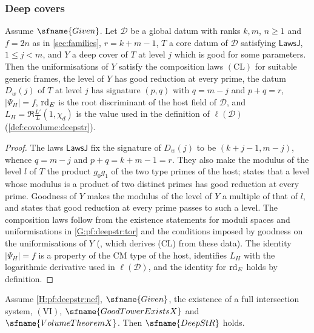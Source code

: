 \subsubsection*{Deep covers}

\begin{lemma}\label{lem:pf:deepstr:params}
Assume $\sfname{Given}$. Let $\mathcal D$ be a global datum with ranks $k,m$, $n\ge1$ and $f=2n$ as in
\cref{sec:families}, $r=k+m-1$, $T$ a core datum of $\mathcal D$ satisfying $\mathsf{LawsJ}$, $1\le j<m$, and $Y$
a deep cover of $T$ at level $j$ which is good for some parameters. Then the uniformisations of $Y$ satisfy
the composition laws $\mathrm{(CL)}$ for suitable generic frames, the level of $Y$ has good reduction at
every prime, the datum $D_w(j)$ of $T$ at level $j$ has signature $(p,q)$ with $q=m-j$ and $p+q=r$,
$|\Psi_H|=f$, $\operatorname{rd}_E$ is the root discriminant of the host field of $\mathcal D$, and
$L_H=\Re\frac{L'}{L}(1,\chi_d)$ is the value used in the definition of $\ell(\mathcal D)$
(\cref{def:covolume:deepstr}).
\end{lemma}

\begin{proof}
The laws $\mathsf{LawsJ}$ fix the signature of $D_w(j)$ to be $(k+j-1,m-j)$, whence $q=m-j$ and
$p+q=k+m-1=r$. They also make the modulus of the level $l$ of $T$ the product $g_0g_1$ of the two type primes
of the host;  states that a level whose modulus is a product
of two distinct primes has good reduction at every prime. Goodness of $Y$ makes the modulus of the level of $Y$ a multiple of that of $l$, and
 states that good reduction at every prime passes to such a
level. The composition laws follow from the existence statements for moduli spaces and uniformisations in
\ref{G:pf:deepstr:tor} and the conditions imposed by goodness on the uniformisations of $Y$
(, which derives (CL) from these data).
The identity $|\Psi_H|=f$ is a property of the CM type of the host,
 identifies $L_H$ with the logarithmic
derivative used in $\ell(\mathcal D)$, and the identity for $\operatorname{rd}_E$ holds by definition.
\end{proof}

\begin{theorem}\label{thm:pf:deepstr:ofvolume}
Assume \ref{H:pf:deepstr:nef}, $\sfname{Given}$, the existence of a full intersection system, $\mathrm{(VI)}$,
$\sfname{GoodTowerExistsX}$ and $\sfname{VolumeTheoremX}$. Then $\sfname{DeepStR}$ holds.
\end{theorem}

